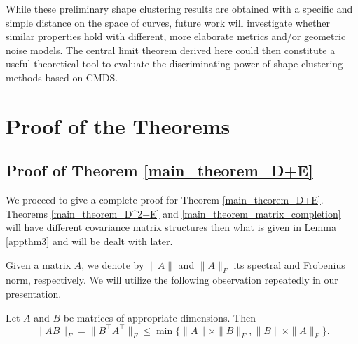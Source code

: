 While these preliminary shape clustering results are obtained with a specific and simple distance on the space of curves, future work will investigate whether similar properties hold with different, more elaborate metrics and/or geometric noise models. The central limit theorem derived here could then constitute a useful theoretical tool to evaluate the discriminating power of shape clustering methods based on CMDS.











\section{Proof of the Theorems}

\subsection{Proof of Theorem \ref{main_theorem_D+E}}
\label{proof}
We proceed to give a complete proof for Theorem \ref{main_theorem_D+E}. Theorems \ref{main_theorem_D^2+E} and \ref{main_theorem_matrix_completion} will have different covariance matrix structures then what is given in Lemma \ref{appthm3} and will be dealt with later.

Given a matrix $A$, we denote by $\| A \|$ and $\|A\|_{F}$ its spectral and Frobenius norm, respectively.
We will utilize the following observation repeatedly in our presentation.
\begin{observation}
\label{appthm1}
 Let $A$ and $B$ be matrices of appropriate dimensions. Then 
 $$\|A B\|_F = \|B^{\top} A^{\top}\|_{F} \leq \min\{ \|A\| \times \|B\|_F, \|B\| \times \|A\|_{F}\}.$$
\end{observation}

